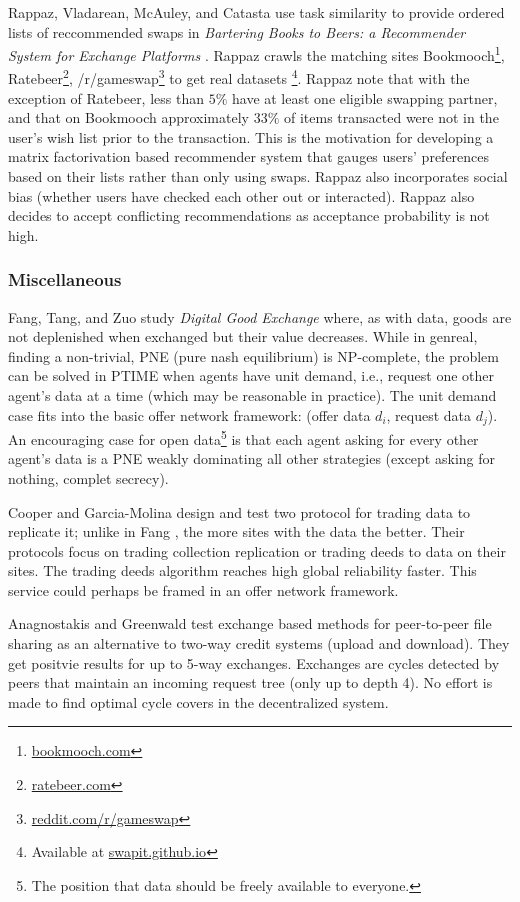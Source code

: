 \documentclass[main.tex]{subfiles}
\begin{document}
Rappaz, Vladarean, McAuley, and Catasta use task similarity to provide ordered lists of reccommended swaps in \textit{Bartering Books to Beers: a Recommender System for Exchange Platforms} \cite{Rap1}. Rappaz crawls the matching sites Bookmooch\footnote{\url{bookmooch.com}}, Ratebeer\footnote{\url{ratebeer.com}}, /r/gameswap\footnote{\url{reddit.com/r/gameswap}} to get real datasets \footnote{Available at \url{swapit.github.io}}. Rappaz note that with the exception of Ratebeer, less than $5\%$ have at least one eligible swapping partner, and that on Bookmooch approximately $33\%$ of items transacted were not in the user's wish list prior to the transaction. This is the motivation for developing a matrix factorivation based recommender system that gauges users' preferences based on their lists rather than only using swaps. Rappaz also incorporates social bias (whether users have checked each other out or interacted). Rappaz also decides to accept conflicting recommendations as acceptance probability is not high.

\subsubsection{Miscellaneous}

Fang, Tang, and Zuo study \textit{Digital Good Exchange} \cite{Fang} where, as with data, goods are not deplenished when exchanged but their value decreases. While in genreal, finding a non-trivial, PNE (pure nash equilibrium) is NP-complete, the problem can be solved in PTIME when agents have unit demand, i.e., request one other agent's data at a time (which may be reasonable in practice). The unit demand case fits into the basic offer network framework: (offer data $d_i$, request data $d_j$). An encouraging case for open data\footnote{The position that data should be freely available to everyone.} is that each agent asking for every other agent's data is a PNE weakly dominating all other strategies (except asking for nothing, complet secrecy).

Cooper and Garcia-Molina \cite{Coo1} design and test two protocol for trading data to replicate it; unlike in Fang \cite{Fang}, the more sites with the data the better. Their protocols focus on trading collection replication or trading deeds to data on their sites. The trading deeds algorithm reaches high global reliability faster. This service could perhaps be framed in an offer network framework.

Anagnostakis and Greenwald \cite{Ana1} test exchange based methods for peer-to-peer file sharing as an alternative to two-way credit systems (upload and download). They get positvie results for up to 5-way exchanges. Exchanges are cycles detected by peers that maintain an incoming request tree (only up to depth 4). No effort is made to find optimal cycle covers in the decentralized system.
\end{document}
